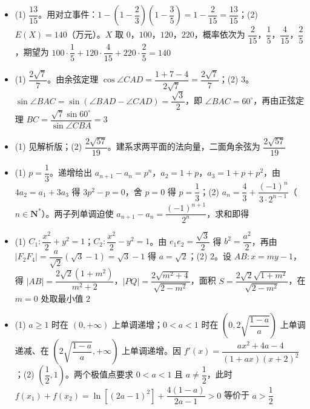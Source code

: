 \begin{itemize}[leftmargin=2.6em]
  \item[\textbf{17.}] (1) $\dfrac{13}{15}$。用对立事件：$1-\left(1-\dfrac23\right)\left(1-\dfrac35\right)=1-\dfrac2{15}=\dfrac{13}{15}$；(2) $E(X)=140$（万元）。$X$ 取 $0$，$100$，$120$，$220$，概率依次为 $\dfrac2{15}$，$\dfrac15$，$\dfrac4{15}$，$\dfrac25$，期望为 $100\cdot\dfrac15+120\cdot\dfrac4{15}+220\cdot\dfrac25=140$
  \item[\textbf{18.}] (1) $\dfrac{2\sqrt7}7$。由余弦定理 $\cos\angle CAD=\dfrac{1+7-4}{2\sqrt7}=\dfrac{2\sqrt7}7$；(2) $3$。$\sin\angle BAC=\sin\left(\angle BAD-\angle CAD\right)=\dfrac{\sqrt3}2$，即 $\angle BAC=60^\circ$，再由正弦定理 $BC=\dfrac{\sqrt7\sin60^\circ}{\sin\angle CBA}=3$
  \item[\textbf{19.}] (1) 见解析版；(2) $\dfrac{2\sqrt{57}}{19}$。建系求两平面的法向量，二面角余弦为 $\dfrac{2\sqrt{57}}{19}$
  \item[\textbf{20.}] (1) $p=\dfrac13$。递增给出 $a_{n+1}-a_n=p^n$，$a_2=1+p$，$a_3=1+p+p^2$，由 $4a_2=a_1+3a_3$ 得 $3p^2-p=0$，舍 $p=0$ 得 $p=\dfrac13$；(2) $a_n=\dfrac43+\dfrac{(-1)^n}{3\cdot2^{n-1}}$（$n\in\mathbf N^*$）。两子列单调迫使 $a_{n+1}-a_n=\dfrac{(-1)^{n+1}}{2^n}$，求和即得
  \item[\textbf{21.}] (1) $C_1:\dfrac{x^2}2+y^2=1$；$C_2:\dfrac{x^2}2-y^2=1$。由 $e_1e_2=\dfrac{\sqrt3}2$ 得 $b^2=\dfrac{a^2}2$，再由 $|F_2F_4|=\dfrac a{\sqrt2}(\sqrt3-1)=\sqrt3-1$ 得 $a=\sqrt2$；(2) $2$。设 $AB:x=my-1$，得 $|AB|=\dfrac{2\sqrt2(1+m^2)}{m^2+2}$，$|PQ|=\dfrac{2\sqrt{m^2+4}}{\sqrt{2-m^2}}$，面积 $S=\dfrac{2\sqrt2\sqrt{1+m^2}}{\sqrt{2-m^2}}$，在 $m=0$ 处取最小值 $2$
  \item[\textbf{22.}] (1) $a\geqslant1$ 时在 $(0,+\infty)$ 上单调递增；$0<a<1$ 时在 $\left(0,2\sqrt{\dfrac{1-a}a}\right)$ 上单调递减、在 $\left(2\sqrt{\dfrac{1-a}a},+\infty\right)$ 上单调递增。因 $f'(x)=\dfrac{ax^2+4a-4}{(1+ax)(x+2)^2}$；(2) $\left(\dfrac12,1\right)$。两个极值点要求 $0<a<1$ 且 $a\neq\dfrac12$，此时 $f(x_1)+f(x_2)=\ln\left[(2a-1)^2\right]+\dfrac{4(1-a)}{2a-1}>0$ 等价于 $a>\dfrac12$
\end{itemize}
